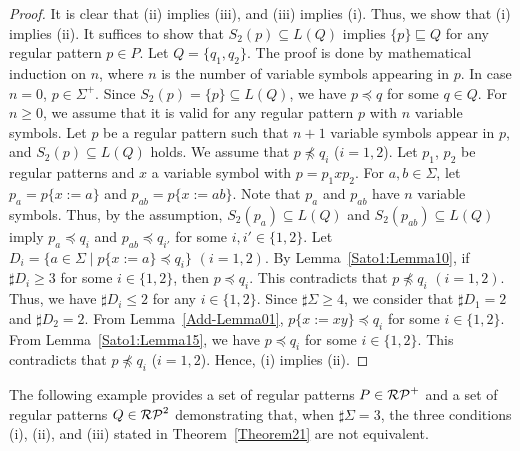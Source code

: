 \begin{proof}
    It is clear that (ii) implies (iii), and (iii) implies (i).
    Thus, we show that (i) implies (ii).
    It suffices to show that $S_{2}(p) \subseteq L(Q)$ implies {\color{red}$\{p\} \sqsubseteq Q$}
    for any regular pattern {\color{red}$p \in P$}.
    Let $Q = \{q_{1}, q_{2}\}$.
    The proof is done by mathematical induction on $n$,
    where $n$ is the number of variable symbols appearing in $p$.
    In case $n=0$, $p \in \Sigma^{+}$.
    Since $S_{2}(p) = \{p\} \subseteq L(Q)$, we have $p \preceq q$
    for some $q \in Q$.
    For $n \geq 0$, we assume that it is valid for any regular pattern $p$ with
    $n$ variable symbols.
    Let $p$ be a regular pattern such that $n+1$ variable symbols appear in $p$,
    and $S_{2}(p) \subseteq L(Q)$ {\color{red}holds}.
    We assume that $p \not\preceq q_{i}$ ($i=1,2$).
    Let $p_{1}$, $p_{2}$ be regular patterns and $x$ a variable symbol
    with $p = p_{1}xp_{2}$.
    For $a, b \in \Sigma$,
    let $p_{a} = p\{x:=a\}$ and $p_{ab} = p\{x:=ab\}$.
    Note that $p_{a}$ and $p_{ab}$ have $n$ variable symbols.
    Thus, by the assumption,
    $S_{2}(p_{a}) \subseteq L(Q)$ and $S_{2}(p_{ab}) \subseteq L(Q)$
    imply $p_{a} \preceq q_{i}$ and $p_{ab} \preceq q_{i'}$ for some
    $i, i' \in \{1,2\}$.
    Let $D_{i} = \{a \in \Sigma \mid p\{x:=a\} \preceq q_{i}\}$ $(i=1,2)$.
    By Lemma~\ref{Sato1:Lemma10},
    if $\sharp D_{i} \geq 3$ for some $i \in \{1,2\}$,
    then $p \preceq q_{i}$.
    This contradicts that $p \not\preceq q_{i}$ $(i=1,2)$.
    Thus, we have $\sharp D_{i} \leq 2$ for any $i \in \{1,2\}$.
    Since $\sharp \Sigma \geq 4$,
    we consider that $\sharp D_{1}=2$ and $\sharp D_{2} = 2$.
    From Lemma~\ref{Add-Lemma01},
    $p\{x:=xy\} \preceq q_{i}$ for some $i \in \{1,2\}$.
    From Lemma~\ref{Sato1:Lemma15}, 
    we have $p \preceq q_{i}$ for some $i \in \{1,2\}$.
    This contradicts that $p \not\preceq q_{i}$ ($i=1,2$).
    Hence, (i) implies (ii).
    \end{proof}

{\color{red} The following example provides a set of regular patterns $P \in \mathcal{RP}^{+}$ and a set of regular patterns $Q \in \mathcal{RP}^{2}$ demonstrating that, when $\sharp\Sigma = 3$, the three conditions (i), (ii), and (iii) stated in Theorem~\ref{Theorem21} are not equivalent.}


